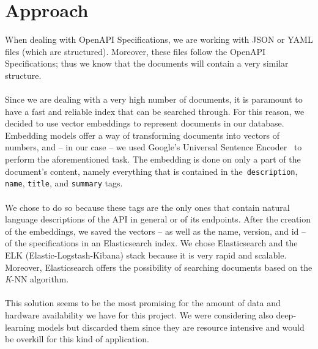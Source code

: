 \section{Approach}\label{sec:approach}
When dealing with OpenAPI Specifications, we are working with JSON or YAML files (which are structured).
Moreover, these files follow the OpenAPI Specifications; thus we know that the documents will contain a very similar structure. \\ \\
Since we are dealing with a very high number of documents, it is paramount to have a fast and reliable index that can be searched through.
For this reason, we decided to use vector embeddings to represent documents in our database.
Embedding models offer a way of transforming documents into vectors of numbers, and -- in our case -- we used Google's Universal Sentence Encoder~\cite{cer_universal_2018} to perform the aforementioned task.
The embedding is done on only a part of the document's content, namely everything that is contained in the~\verb|description|, \verb|name|, \verb|title|, and \verb|summary| tags. \\ \\
We chose to do so because these tags are the only ones that contain natural language descriptions of the API in general or of its endpoints.
After the creation of the embeddings, we saved the vectors -- as well as the name, version, and id -- of the specifications in an Elasticsearch index.
We chose Elasticsearch and the ELK (Elastic-Logstash-Kibana) stack because it is very rapid and scalable.
Moreover, Elasticsearch offers the possibility of searching documents based on the \textit{K}-NN algorithm. \\ \\
This solution seems to be the most promising for the amount of data and hardware availability we have for this project.
We were considering also deep-learning models but discarded them since they are resource intensive and would be overkill for this kind of application.